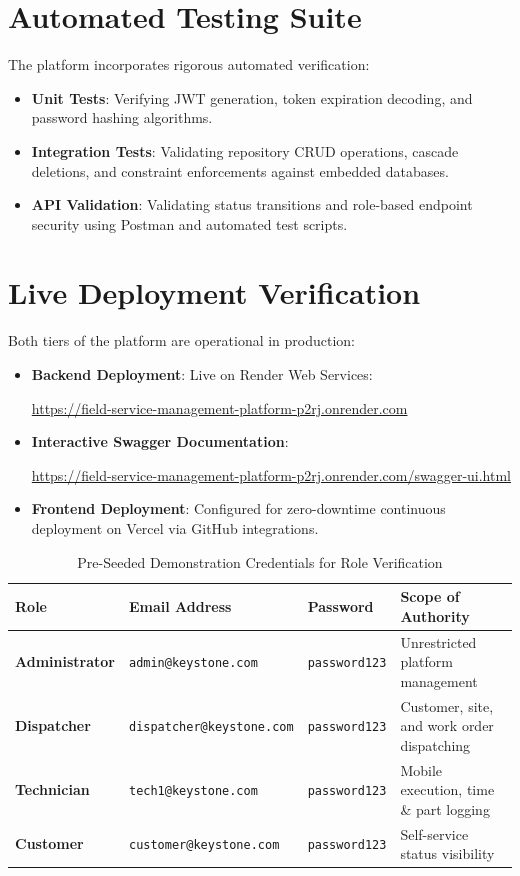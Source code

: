 \documentclass[12pt,a4paper,oneside]{report}
\begin{document}
\section{Automated Testing Suite}
The platform incorporates rigorous automated verification:
\begin{itemize}
    \item \textbf{Unit Tests}: Verifying JWT generation, token expiration decoding, and password hashing algorithms.
    \item \textbf{Integration Tests}: Validating repository CRUD operations, cascade deletions, and constraint enforcements against embedded databases.
    \item \textbf{API Validation}: Validating status transitions and role-based endpoint security using Postman and automated test scripts.
\end{itemize}

\section{Live Deployment Verification}
Both tiers of the platform are operational in production:
\begin{itemize}
    \item \textbf{Backend Deployment}: Live on Render Web Services:
    \begin{center}
        \url{https://field-service-management-platform-p2rj.onrender.com}
    \end{center}
    \item \textbf{Interactive Swagger Documentation}:
    \begin{center}
        \url{https://field-service-management-platform-p2rj.onrender.com/swagger-ui.html}
    \end{center}
    \item \textbf{Frontend Deployment}: Configured for zero-downtime continuous deployment on Vercel via GitHub integrations.
\end{itemize}

\begin{table}[htbp]
    \centering
    \caption{Pre-Seeded Demonstration Credentials for Role Verification}
    \label{tab:seed_credentials}
    \begin{tabular}{llll}
        \toprule
        \textbf{Role} & \textbf{Email Address} & \textbf{Password} & \textbf{Scope of Authority} \\
        \midrule
        \textbf{Administrator} & \texttt{admin@keystone.com} & \texttt{password123} & Unrestricted platform management \\
        \textbf{Dispatcher} & \texttt{dispatcher@keystone.com} & \texttt{password123} & Customer, site, and work order dispatching \\
        \textbf{Technician} & \texttt{tech1@keystone.com} & \texttt{password123} & Mobile execution, time \& part logging \\
        \textbf{Customer} & \texttt{customer@keystone.com} & \texttt{password123} & Self-service status visibility \\
        \bottomrule
    \end{tabular}
\end{table}
\end{document}

